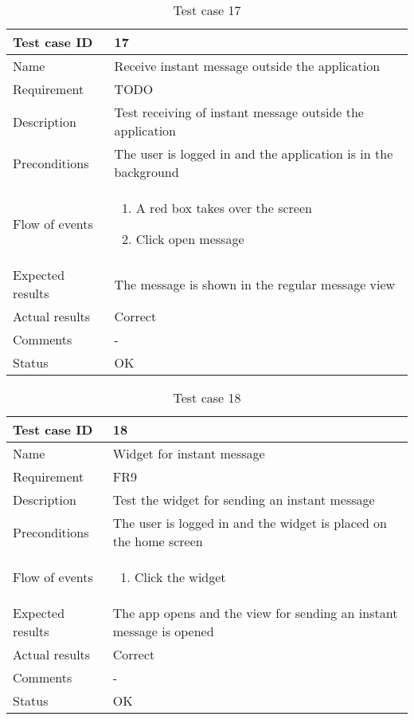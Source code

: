 		\begin{table}
			\begin{tabular}{l|p{10cm}}
				Test case ID & 17 \\ \hline
				Name & Receive instant message outside the application\\ \hline
				Requirement & TODO\\ \hline
				Description & Test receiving of instant message outside the application\\ \hline
				Preconditions & The user is logged in and the application is in the background\\ \hline
				Flow of events & 
					\begin{enumerate}
						\item{}A red box takes over the screen
						\item{}Click open message
					\end{enumerate} \\ \hline
				Expected results & The message is shown in the regular message view\\ \hline
				Actual results &Correct\\ \hline
				Comments &-\\ \hline
				Status & OK\\ \hline
			\end{tabular}
			\caption{Test case 17} \label{tab:case17}
		\end{table}

		\begin{table}
			\begin{tabular}{l|p{10cm}}
				Test case ID & 18 \\ \hline
				Name & Widget for instant message\\ \hline
				Requirement & FR9\\ \hline
				Description & Test the widget for sending an instant message\\ \hline
				Preconditions & The user is logged in and the widget is placed on the home screen\\ \hline
				Flow of events & 
					\begin{enumerate}
						\item{}Click the widget
					\end{enumerate} \\ \hline
				Expected results & The app opens and the view for sending an instant message is opened\\ \hline
				Actual results & Correct\\ \hline
				Comments &-\\ \hline
				Status &OK \\ \hline
			\end{tabular}
			\caption{Test case 18} \label{tab:case18}
		\end{table}

